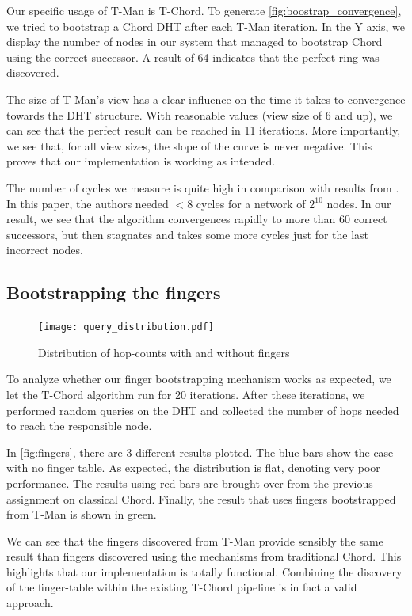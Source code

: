 \documentclass[11pt,a4paper,parskip=half]{scrartcl}
\begin{document}
Our specific usage of T-Man is T-Chord.
To generate \autoref{fig:boostrap_convergence}, we tried to bootstrap a Chord DHT after each T-Man iteration.
In the Y axis, we display the number of nodes in our system that managed to bootstrap Chord using the correct successor.
A result of 64 indicates that the perfect ring was discovered.

The size of T-Man's view has a clear influence on the time it takes to convergence towards the DHT structure.
With reasonable values (view size of 6 and up), we can see that the perfect result can be reached in 11 iterations.
More importantly, we see that, for all view sizes, the slope of the curve is never negative.
This proves that our implementation is working as intended.

The number of cycles we measure is quite high in comparison with results from \autocite{cod}.
In this paper, the authors needed $<8$ cycles for a network of $2^{10}$ nodes.
In our result, we see that the algorithm convergences rapidly to more than 60 correct successors, but then stagnates and takes some more cycles just for the last incorrect nodes.

\subsection{Bootstrapping the fingers}

\begin{figure}
\centering
\texttt{[image: query\_distribution.pdf]}
\caption{Distribution of hop-counts with and without fingers}
\label{fig:fingers}
\end{figure}

To analyze whether our finger bootstrapping mechanism works as expected, we let the T-Chord algorithm run for 20 iterations.
After these iterations, we performed random queries on the DHT and collected the number of hops needed to reach the responsible node.

In \autoref{fig:fingers}, there are 3 different results plotted.
The blue bars show the case with no finger table.
As expected, the distribution is flat, denoting very poor performance.
The results using red bars are brought over from the previous assignment on classical Chord.
Finally, the result that uses fingers bootstrapped from T-Man is shown in green.

We can see that the fingers discovered from T-Man provide sensibly the same result than fingers discovered using the mechanisms from traditional Chord.
This highlights that our implementation is totally functional.
Combining the discovery of the finger-table within the existing T-Chord pipeline is in fact a valid approach.
\end{document}
